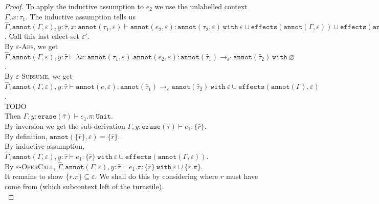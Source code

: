 \documentclass{llncs}
\newcommand{\keywadj}[1]{\mathtt{#1}}
\newcommand{\keyw}[1]{\keywadj{#1}~}
\newcommand{\kw}[1]{\keyw{ #1 }}
\newcommand{\kwa}[1]{\keywadj{ #1 }}
\newcommand{\Unit}[0]{ \kwa{Unit} }
\begin{document}
\begin{proof}
\noindent
To apply the inductive assumption to $e_2$ we use the unlabelled context $\Gamma, x: \tau_1$. The inductive assumption tells us $\hat \Gamma, \kwa{annot}(\Gamma, \varepsilon), y: \hat \tau, x: \kwa{annot}(\tau_1, \varepsilon) \vdash \kwa{annot}(e_2, \varepsilon): \kwa{annot}(\tau_2, \varepsilon)~\kw{with} \varepsilon \cup \kwa{effects}(\kwa{annot}(\Gamma, \varepsilon)) \cup \kwa{effects}(\kwa{annot}(\tau_1, \varepsilon))$. Call this last effect-set $\varepsilon'$. \\

\noindent
By \textsc{$\varepsilon$-Abs}, we get $\hat \Gamma, \kwa{annot}(\Gamma, \varepsilon), y: \hat \tau \vdash \lambda x: \kwa{annot}(\tau_1, \varepsilon) . \kwa{annot}(e_2, \varepsilon) : \kwa{annot}(\hat \tau_1) \rightarrow_{\varepsilon'} \kwa{annot}(\hat \tau_2)~\kw{with} \varnothing$. \\

\noindent
By \textsc{$\varepsilon$-Subsume}, we get $\hat \Gamma, \kwa{annot}(\Gamma, \varepsilon), y: \hat \tau \vdash \kwa{annot}(e, \varepsilon) : \kwa{annot}(\hat \tau_1) \rightarrow_{\varepsilon} \kwa{annot}(\hat \tau_2)~\kw{with} \varepsilon \cup \kwa{effects}(\kwa{annot}(\Gamma), \varepsilon) $. \\

\noindent
{} TODO\\

\noindent
{} Then $\Gamma, y: \kwa{erase}(\hat \tau) \vdash e_1.\pi : \Unit$. \\

\noindent
By inversion we get the sub-derivation $\Gamma, y: \kwa{erase}(\hat \tau) \vdash e_1: \{ \bar r \}$. \\

\noindent
By definition, $\kwa{annot}(\{ \bar r \}, \varepsilon) = \{ \bar r \}$. \\

\noindent
By inductive assumption, $\hat \Gamma, \kwa{annot}(\Gamma, \varepsilon), y: \hat \tau \vdash e_1: \{ \bar r \} ~\kw{with} \varepsilon \cup \kwa{effects}(\kwa{annot}(\Gamma, \varepsilon))$. \\

\noindent
By \textsc{$\varepsilon$-OperCall}, $\hat \Gamma, \kwa{annot}(\Gamma, \varepsilon), y: \hat \tau \vdash e_1.\pi: \{ \bar r \} ~\kw{with} \varepsilon \cup \{ \bar r.\pi \}$. \\

\noindent
It remains to show $\{ \bar r.\pi \} \subseteq \varepsilon$. We shall do this by considering where $r$ must have come from (which subcontext left of the turnstile). \\


\end{proof}
\end{document}
